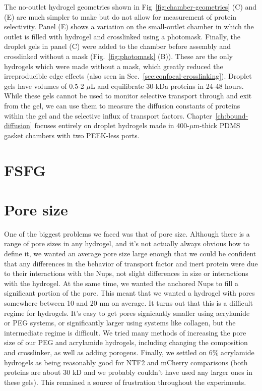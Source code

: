 The no-outlet hydrogel geometries shown in Fig~\ref{fig:chamber-geometries} (C) and (E) are much simpler to make but do not allow for measurement of protein selectivity.  Panel (E) shows a variation on the small-outlet chamber in which the outlet is filled with hydrogel and crosslinked using a photomask. Finally, the droplet gels in panel (C) were added to the chamber before assembly and crosslinked without a mask (Fig.~\ref{fig:photomask} (B)).  These are the only hydrogels which were made without a mask, which greatly reduced the irreproducible edge effects (also seen in Sec.~\ref{sec:confocal-crosslinking}).  Droplet gels have volumes of 0.5-2 $\mu$L and equilibrate 30-kDa proteins in 24-48 hours.  While these gels cannot be used to monitor selective transport through and exit from the gel, we can use them to measure the diffusion constants of proteins within the gel and the selective influx of transport factors.  Chapter~\ref{ch:bound-diffusion} focuses entirely on droplet hydrogels made in 400-$\mu$m-thick PDMS gasket chambers with two PEEK-less ports.

\section{FSFG}

\section{Pore size}

One of the biggest problems we faced was that of pore size.  Although there is a range of pore sizes in any hydrogel, and it's not actually always obvious how to define it, we wanted an average pore size large enough that we could be confident that any differences in the behavior of transport factor and inert protein were due to their interactions with the Nups, not slight differences in size or interactions with the hydrogel.  At the same time, we wanted the anchored Nups to fill a significant portion of the pore.  This meant that we wanted a hydrogel with pores somewhere between 10 and 20 nm on average.  It turns out that this is a difficult regime for hydrogels.  It's easy to get pores signicantly smaller using acrylamide or PEG systems, or significantly larger using systems like collagen, but the intermediate regime is difficult.  We tried many methods of increasing the pore size of our PEG and acrylamide hydrogels, including changing the composition and crosslinker, as well as adding porogens.  Finally, we settled on 6\% acrylamide hydrogels as being reasonably good for NTF2 and mCherry comparisons (both proteins are about 30 kD and we probably couldn't have used any larger ones in these gels).  This remained a source of frustration throughout the experiments.

